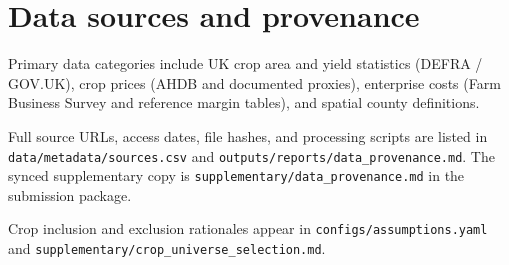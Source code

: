 \section{Data sources and provenance}
\label{app:data-sources}

Primary data categories include UK crop area and yield statistics (DEFRA / GOV.UK),
crop prices (AHDB and documented proxies), enterprise costs (Farm Business Survey and
reference margin tables), and spatial county definitions.

Full source URLs, access dates, file hashes, and processing scripts are listed in
\texttt{data/metadata/sources.csv} and \texttt{outputs/reports/data\_provenance.md}.
The synced supplementary copy is \texttt{supplementary/data\_provenance.md} in the
submission package.

Crop inclusion and exclusion rationales appear in \texttt{configs/assumptions.yaml} and
\texttt{supplementary/crop\_universe\_selection.md}.
